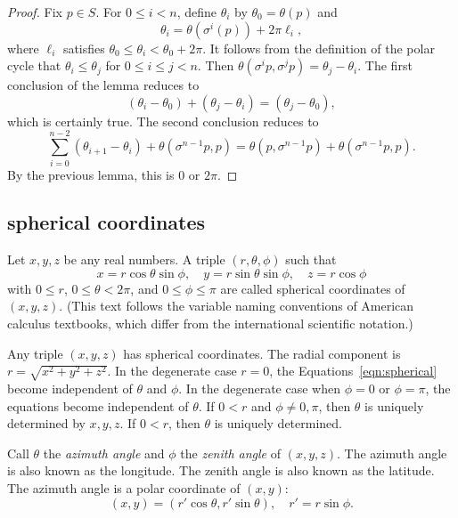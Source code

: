 \begin{proof}
Fix $p\in S$.
For $0\le i<n$, define $\theta_i$ by
   $\theta_0=\theta(p)$ and 
   $$\theta_i = \theta(\sigma^i(p)) + 2\pi \ell_i,$$
where  $\ell_i$ satisfies $\theta_0\le \theta_i < \theta_0+2\pi$.
It follows from the definition of the polar cycle that
$\theta_i \le \theta_j$ for $0\le i\le j < n$.  Then
$\theta(\sigma^i p ,\sigma^j p) = \theta_j - \theta_i$.
The first conclusion of the lemma reduces to
  $$
  (\theta_i-\theta_0) + (\theta_j-\theta_i) = (\theta_j-\theta_0),
  $$
which is certainly true.
The second conclusion reduces to
  $$
  \sum_{i=0}^{n-2} (\theta_{i+1}-\theta_i) + \theta(\sigma^{n-1}p,p)
  = \theta(p,\sigma^{n-1}p) + \theta(\sigma^{n-1}p,p).
  $$
By the previous lemma, this is $0$ or $2\pi$.
\end{proof}

\subsection{spherical coordinates}
\label{sec:spherical}



\begin{definition}
Let $x,y,z$ be any real numbers.  A
triple $(r,\theta,\phi)$ such that
    \begin{equation}
    \label{eqn:spherical}
    x = r\cos\theta\sin\phi,\quad y = r\sin\theta\sin\phi,\quad
    z = r\cos\phi
    \end{equation}
with $0\le r$, $0\le\theta<2\pi$, and $0\le\phi\le\pi$ are called
spherical coordinates of $(x,y,z)$.  (This text follows the variable
naming conventions of American calculus textbooks, which differ
from the international scientific notation.)
\end{definition}
%
%
%
%
%

Any triple $(x,y,z)$ has spherical coordinates.
The radial component is $r = \sqrt{x^2+y^2+z^2}$.  In the degenerate case $r=0$,
the Equations~\ref{eqn:spherical} become independent of $\theta$
and $\phi$. In the degenerate case when $\phi = 0$ or $\phi =
\pi$, the equations become independent of $\theta$. If $0<r$ and $\phi\ne 0,\pi$,  then $\theta$ is uniquely
determined by $x,y,z$. If $0<r$, then $\theta$ is uniquely determined.


Call $\theta$ the {\it azimuth angle\/} and $\phi$ the {\it
zenith angle\/} of $(x,y,z)$.  The azimuth angle is also known as
the longitude.  The zenith angle is also known as the latitude. The
azimuth angle is a polar coordinate of $(x,y)$:
    $$
    (x,y) = (r'\cos\theta,r'\sin\theta), \quad r' = r\sin\phi.
    $$
%
%
%
%
%
%
%


